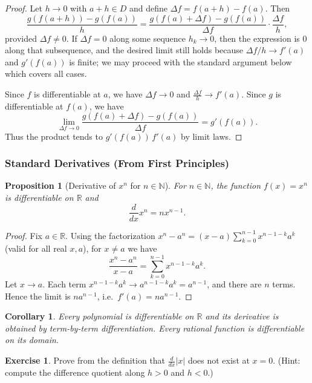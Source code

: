 \documentclass[12pt]{article}
\numberwithin{equation}{section}
\def\abs#1{|#1|}
\newcommand{\RR}{\mathbb{R}}
\newcommand{\NN}{\mathbb{N}}
\DeclarePairedDelimiter{\abs}{\lvert}{\rvert}
\theoremstyle{plain}
\newtheorem{proposition}[theorem]{Proposition}
\newtheorem{corollary}[theorem]{Corollary}
\theoremstyle{definition}
\newtheorem{exercise}[theorem]{Exercise}
\theoremstyle{remark}
\begin{document}
\begin{proof}
Let $h\to 0$ with $a+h\in D$ and define $\Delta f = f(a+h)-f(a)$.
Then
\[
\frac{g(f(a+h))-g(f(a))}{h}
=
\frac{g(f(a)+\Delta f)-g(f(a))}{\Delta f}\cdot \frac{\Delta f}{h},
\]
provided $\Delta f\neq 0$.
If $\Delta f=0$ along some sequence $h_k\to 0$, then the expression is $0$ along that subsequence, and the desired limit still holds
because $\Delta f/h \to f'(a)$ and $g'(f(a))$ is finite; we may proceed with the standard argument below which covers all cases.

Since $f$ is differentiable at $a$, we have $\Delta f\to 0$ and $\frac{\Delta f}{h}\to f'(a)$.
Since $g$ is differentiable at $f(a)$, we have
\[
\lim_{\Delta f\to 0}\frac{g(f(a)+\Delta f)-g(f(a))}{\Delta f}=g'(f(a)).
\]
Thus the product tends to $g'(f(a))\,f'(a)$ by limit laws.
\end{proof}

\subsubsection{Standard Derivatives (From First Principles)}

\begin{proposition}[Derivative of $x^n$ for $n\in\NN$]\label{prop:deriv-power}
For $n\in\NN$, the function $f(x)=x^n$ is differentiable on $\RR$ and
\[
\frac{d}{dx}x^n = n x^{n-1}.
\]
\end{proposition}

\begin{proof}
Fix $a\in\RR$.
Using the factorization $x^n-a^n=(x-a)\sum_{k=0}^{n-1}x^{n-1-k}a^k$ (valid for all real $x,a$),
for $x\neq a$ we have
\[
\frac{x^n-a^n}{x-a} = \sum_{k=0}^{n-1} x^{n-1-k}a^k.
\]
Let $x\to a$. Each term $x^{n-1-k}a^k \to a^{n-1-k}a^k=a^{n-1}$, and there are $n$ terms.
Hence the limit is $n a^{n-1}$, i.e.\ $f'(a)=n a^{n-1}$.
\end{proof}

\begin{corollary}
Every polynomial is differentiable on $\RR$ and its derivative is obtained by term-by-term differentiation.
Every rational function is differentiable on its domain.
\end{corollary}

\begin{exercise}
Prove from the definition that $\frac{d}{dx}\abs{x}$ does not exist at $x=0$.
(Hint: compute the difference quotient along $h>0$ and $h<0$.)
\end{exercise}
\end{document}
